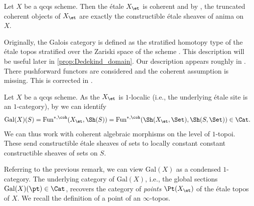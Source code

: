 \documentclass[leqno]{article}
\renewcommand{\Fun}{\mathrm{Fun}}
\renewcommand{\Gal}{\mathrm{Gal}}
\newcommand{\Extr}{\categ{Extr}}
\begin{document}
\begin{recollection}\label{rec:coherent_is_constructible}
    Let $ X $ be a qcqs scheme.
    Then the \'etale \topos $ X_{\et} $ is coherent \cite[Proposition 3.7.3]{Exodromy} and by \cite[Lemma 9.5.3 \& Proposition 9.5.4]{Exodromy}, the truncated coherent objects of $ X_{\et} $ are exactly the constructible étale sheaves of anima on $ X $.
\end{recollection}

%
\begin{remark}
    Originally, the Galois category is defined as the stratified homotopy type of the \'etale topos stratified over the Zariski space of the scheme \cite[Definition 12.1.3]{Exodromy}. This description will be useful later in \cref{prop:Dedekind_domain}.
    Our description appears roughly in \cite[Example 13.5.4]{Exodromy}.
    There pushforward functors are considered and the coherent assumption is missing. This is corrected in \cite[Definition 3.24]{The_condensed_homotopy_type}.
\end{remark}
%
\begin{remark}
    Let $X$ be a qcqs scheme.
    As the \topos $X_{\et}$ is $1$-localic (i.e., the underlying \'etale site is an $1$-category), by \cite[Lemma 6.4.5.6]{HTT} we can identify $$\Gal(X)(S)=\Fun^{*,\coh}(X_{\et},\Sh(S))=\Fun^{*,\coh}(\Sh(X_{\et},\Set),\Sh(S,\Set))\in \Cat.$$ We can thus work with coherent algebraic morphisms on the level of $1$-topoi. These send constructible \'etale sheaves of sets to locally constant constant constructible sheaves of sets on $S$. 
\end{remark}
%
Referring to the previous remark, we can view $\Gal(X)$ as a condensed $1$-category.
The underlying category of $\Gal(X)$, i.e., the global sections $ \Gal(X)(\pt)\in \Cat $, recovers the category of \textit{points} $ \Pt(X_{\et}) $ of the étale topos of $ X $. We recall the definition of a point of an $\infty$-topos.
\end{document}
